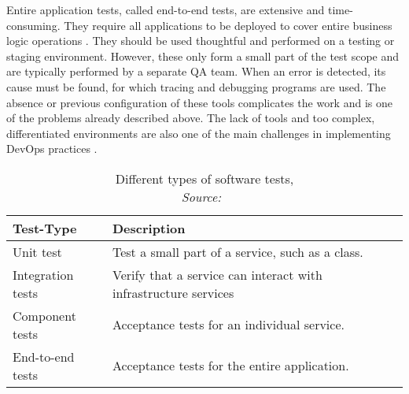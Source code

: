         Entire application tests, called end-to-end tests, are extensive and time-consuming. They require all applications to be deployed to cover entire business logic operations \cite{microtest}. They should be used thoughtful and performed on a testing or staging environment. However, these only form a small part of the test scope and are typically performed by a separate \ac{QA} team. When an error is detected, its cause must be found, for which tracing and debugging programs are used. The absence or previous configuration of these tools complicates the work and is one of the problems already described above. The lack of tools and too complex, differentiated environments are also one of the main challenges in implementing DevOps practices \cite{devops_challenge}.

        \begin{table}[]
            \centering
            \begin{tabularx}{0.9\textwidth}{lX}
                Test-Type & Description \\ \midrule\midrule
                Unit test& Test a small part of a service, such as a class.\\
                Integration tests & Verify that a service can interact with infrastructure services \\
                Component tests & Acceptance tests for an individual service. \\
                End-to-end tests & Acceptance tests for the entire application.
            \end{tabularx}
            \caption{Different types of software tests, \\\textit{Source:~\cite{microtest}}}\label{tab::tests}
        \end{table}

